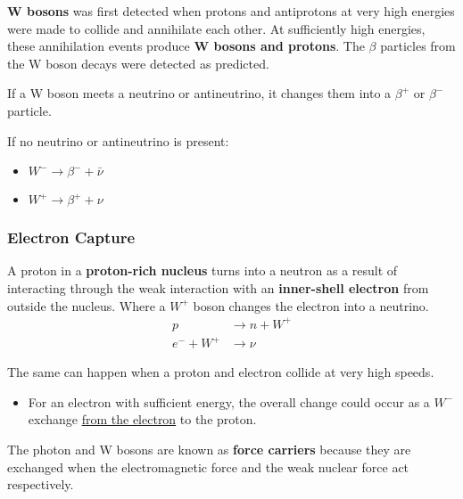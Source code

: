 \textbf{W bosons} was first detected when protons and antiprotons at very high energies were made to collide and annihilate each other. At sufficiently high energies, these annihilation events produce \textbf{W bosons and protons}. The $\beta$ particles from the W boson decays were detected as predicted.

If a W boson meets a neutrino or antineutrino, it changes them into a $\beta^+$ or $\beta^-$ particle.

If no neutrino or antineutrino is present:
\begin{itemize}
    \item $W^-\to\beta^-+\bar\nu$
    \item $W^+\to\beta^++\nu$
\end{itemize}

\subsubsection*{Electron Capture}

A proton in a \textbf{proton-rich nucleus} turns into a neutron as a result of interacting through the weak interaction with an \textbf{inner-shell electron} from outside the nucleus. Where a $W^+$ boson changes the electron into a neutrino.
\begin{align*}
    p&\to n+W^+\\
    e^-+W^+&\to\nu
\end{align*}

The same can happen when a proton and electron collide at very high speeds.
\begin{itemize}
    \item For an electron with sufficient energy, the overall change could occur as a $W^-$ exchange \underline{from the electron} to the proton.
\end{itemize}

The photon and W bosons are known as \textbf{force carriers} because they are exchanged when the electromagnetic force and the weak nuclear force act respectively.

